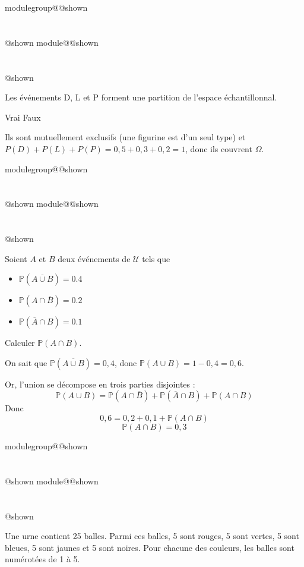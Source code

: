 \documentclass{Evaluation}
\makeatletter
\newcommand{\currentmodulekey}{}
\newcommand{\currentmoduletitle}{}
\newcommand{\currentgroupkey}{}
\newcommand{\currentgrouptitle}{}
\newcommand{\showmoduleifneeded}{%
  \ifx\currentgroupkey\empty\else
    \expandafter\ifx\csname modulegroup@\currentgroupkey @shown\endcsname\relax
      \section*{\currentgrouptitle}%
      \expandafter\gdef\csname modulegroup@\currentgroupkey @shown\endcsname{1}%
    \fi
  \fi
  \expandafter\ifx\csname module@\currentmodulekey @shown\endcsname\relax
    \section*{\currentmoduletitle}%
    \expandafter\gdef\csname module@\currentmodulekey @shown\endcsname{1}%
  \fi
}
\newenvironment{H23}{\showmoduleifneeded}{}
\newenvironment{A24}{\showmoduleifneeded}{}
\newenvironment{H26r}{\showmoduleifneeded}{}
\makeatother
\begin{document}
\begin{questions}
\begin{H26r}
\begin{parts}
\begin{subparts}
        \subpart[1] Les événements D, L et P forment une partition de l'espace échantillonnal.
        
        \begin{oneparcheckboxes}
            \correctchoice Vrai
            \choice Faux
        \end{oneparcheckboxes}
        \begin{solution}
        Ils sont mutuellement exclusifs (une figurine est d'un seul type) et $P(D)+P(L)+P(P)=0{,}5+0{,}3+0{,}2=1$, donc ils couvrent $\Omega$.
        \end{solution}
    \end{subparts}
    
\end{parts}
\end{H26r}

\begin{H23}
\question {} %
Soient $A$ et $B$ deux événements de $\mathcal{U}$ tels que 
\begin{itemize}
\item $\mathbb{P}(\overline{A \cup B})=0.4$
\item $\mathbb{P}(A \cap \overline{B})=0.2$
\item $\mathbb{P}(\overline{A}\cap B)=0.1$
\end{itemize}
Calculer $\mathbb{P}(A \cap B)$.

\begin{solution}
On sait que $\mathbb{P}(\overline{A \cup B}) = 0{,}4$, donc $\mathbb{P}(A \cup B) = 1 - 0{,}4 = 0{,}6$.

Or, l'union se décompose en trois parties disjointes :
$$\mathbb{P}(A \cup B) = \mathbb{P}(A \cap \overline{B}) + \mathbb{P}(\overline{A} \cap B) + \mathbb{P}(A \cap B)$$
Donc
$$0{,}6 = 0{,}2 + 0{,}1 + \mathbb{P}(A \cap B)$$
$$\mathbb{P}(A \cap B) = 0{,}3$$
\end{solution}
\end{H23}

\begin{A24}
\question {} %
Une urne contient 25 balles.
 Parmi ces balles, 5 sont rouges, 5 sont vertes, 5 sont bleues, 5 sont jaunes et 5 sont noires.
 Pour chacune des couleurs, les balles sont numérotées de 1 à 5.

\end{A24}
\end{questions}
\end{document}
